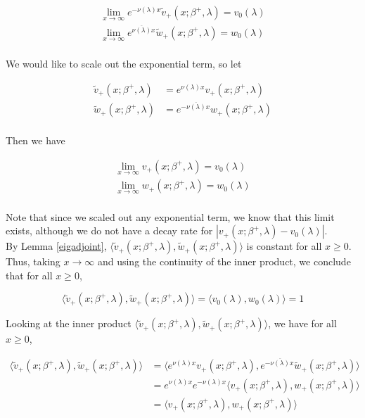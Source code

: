 \documentclass[12pt]{article}
\begin{document}
\begin{align*}
\lim_{x \rightarrow \infty} e^{-\nu(\lambda) x} \tilde{v}_+(x; \beta^+, \lambda) = v_0(\lambda) \\
\lim_{x \rightarrow \infty} e^{\overline{\nu(\lambda)} x} \tilde{w}_+(x; \beta^+, \lambda) = w_0(\lambda) \\
\end{align*}

We would like to scale out the exponential term, so let

\begin{align*}
\tilde{v}_+(x; \beta^+, \lambda) &= e^{\nu(\lambda) x } v_+(x; \beta^+, \lambda) \\
\tilde{w}_+(x; \beta^+, \lambda) &= e^{-\overline{\nu(\lambda)} x } w_+(x; \beta^+, \lambda) \\
\end{align*}

Then we have

\begin{align*}
\lim_{x \rightarrow \infty} v_+(x; \beta^+, \lambda) = v_0(\lambda) \\
\lim_{x \rightarrow \infty} w_+(x; \beta^+, \lambda) = w_0(\lambda) \\
\end{align*}

Note that since we scaled out any exponential term, we know that this limit exists, although we do not have a decay rate for $|v_+(x; \beta^+, \lambda) - v_0(\lambda)|$.\\

By Lemma \ref{eigadjoint}, $\langle \tilde{v}_+(x; \beta^+, \lambda), \tilde{w}_+(x; \beta^+, \lambda) \rangle$ is constant for all $x \geq 0$. Thus, taking $x \rightarrow \infty$ and using the continuity of the inner product, we conclude that for all $x \geq 0$,

\[
\langle \tilde{v}_+(x; \beta^+, \lambda), \tilde{w}_+(x; \beta^+, \lambda) \rangle = \langle v_0(\lambda), w_0(\lambda) \rangle = 1
\]

Looking at the inner product $\langle \tilde{v}_+(x; \beta^+, \lambda), \tilde{w}_+(x; \beta^+, \lambda) \rangle$, we have for all $x \geq 0$,

\begin{align*}
\langle \tilde{v}_+(x; \beta^+, \lambda), \tilde{w}_+(x; \beta^+, \lambda) \rangle
&= \langle e^{\nu(\lambda) x } v_+(x; \beta^+, \lambda), e^{-\overline{\nu(\lambda)} x} \tilde{w}_+(x; \beta^+, \lambda) \rangle \\
&= e^{\nu(\lambda) x } e^{-\nu(\lambda) x } \langle v_+(x; \beta^+, \lambda), w_+(x; \beta^+, \lambda) \rangle \\
&= \langle v_+(x; \beta^+, \lambda), w_+(x; \beta^+, \lambda) \rangle
\end{align*}
\end{document}
